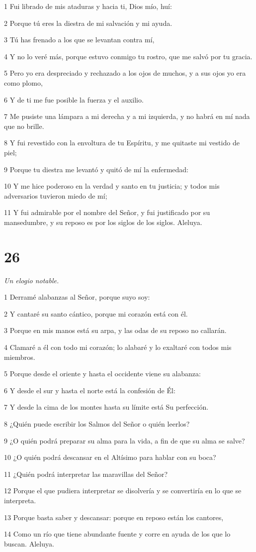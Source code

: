 \par 1 Fui librado de mis ataduras y hacia ti, Dios mío, huí:
\par 2 Porque tú eres la diestra de mi salvación y mi ayuda.
\par 3 Tú has frenado a los que se levantan contra mí,
\par 4 Y no lo veré más, porque estuvo conmigo tu rostro, que me salvó por tu gracia.
\par 5 Pero yo era despreciado y rechazado a los ojos de muchos, y a sus ojos yo era como plomo,
\par 6 Y de ti me fue posible la fuerza y ​​el auxilio.
\par 7 Me pusiste una lámpara a mi derecha y a mi izquierda, y no habrá en mí nada que no brille.
\par 8 Y fui revestido con la envoltura de tu Espíritu, y me quitaste mi vestido de piel;
\par 9 Porque tu diestra me levantó y quitó de mí la enfermedad:
\par 10 Y me hice poderoso en la verdad y santo en tu justicia; y todos mis adversarios tuvieron miedo de mí;
\par 11 Y fui admirable por el nombre del Señor, y fui justificado por su mansedumbre, y su reposo es por los siglos de los siglos. Aleluya.

\chapter{26}

\par \textit{Un elogio notable.}

\par 1 Derramé alabanzas al Señor, porque suyo soy:
\par 2 Y cantaré su santo cántico, porque mi corazón está con él.
\par 3 Porque en mis manos está su arpa, y las odas de su reposo no callarán.
\par 4 Clamaré a él con todo mi corazón; lo alabaré y lo exaltaré con todos mis miembros.
\par 5 Porque desde el oriente y hasta el occidente viene su alabanza:
\par 6 Y desde el sur y hasta el norte está la confesión de Él:
\par 7 Y desde la cima de los montes hasta su límite está Su perfección.
\par 8 ¿Quién puede escribir los Salmos del Señor o quién leerlos?
\par 9 ¿O quién podrá preparar su alma para la vida, a fin de que su alma se salve?
\par 10 ¿O quién podrá descansar en el Altísimo para hablar con su boca?
\par 11 ¿Quién podrá interpretar las maravillas del Señor?
\par 12 Porque el que pudiera interpretar se disolvería y se convertiría en lo que se interpreta.
\par 13 Porque basta saber y descansar: porque en reposo están los cantores,
\par 14 Como un río que tiene abundante fuente y corre en ayuda de los que lo buscan. Aleluya.

